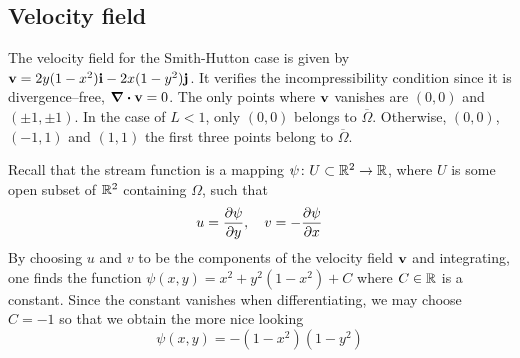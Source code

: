 
\subsection{Velocity field}

The velocity field for the Smith-Hutton case is given by $\vb{v} = 2 y (1 - x^2)
\vb{i} - 2 x (1 - y^2) \vb{j}$. It verifies the incompressibility condition
since it is divergence--free, \ie $\div{\vb{v}} = 0$. The only points where
$\vb{v}$ vanishes are $(0,0)$ and $(\pm 1, \pm 1)$. In the case of $L < 1$, only
$(0,0)$ belongs to $\overline{\Omega}$. Otherwise, $(0,0)$, $(-1,1)$ and $(1,1)$
the first three points belong to $\overline{\Omega}$. 

Recall that the
stream function is a mapping $\psi \colon U \subset \mathbb{R}^2 \to \mathbb{R}$, where
$U$ is some open subset of $\mathbb{R}^2$ containing $\Omega$, such that
\begin{equation*}
	u = \pdv{\psi}{y}, \quad
	v = -\pdv{\psi}{x}
\end{equation*}
By choosing $u$ and $v$ to be the components of the velocity field $\vb{v}$ and
integrating, one finds the function $\psi(x,y) = x^2 + y^2 (1 - x^2) + C$ where
$C \in \mathbb{R}$ is a constant. Since the constant vanishes when differentiating,
we may choose $C = -1$ so that we obtain the more nice looking
\begin{equation*}
	\psi(x,y) = -(1 - x^2)(1 - y^2)
\end{equation*}

